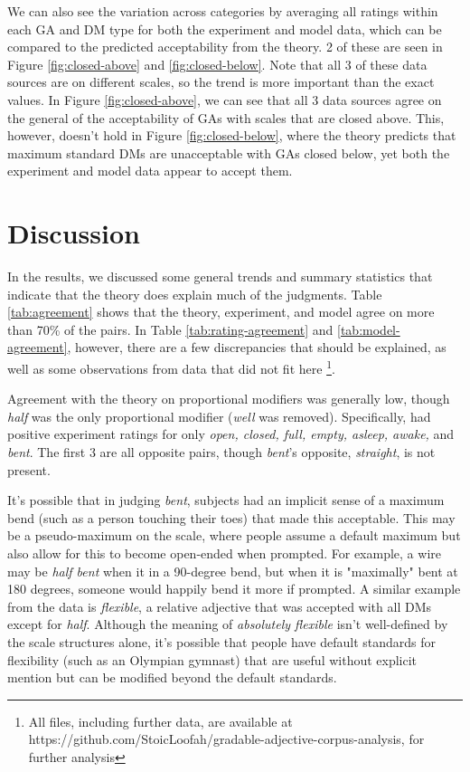 \documentclass[11pt]{article}
\begin{document}
We can also see the variation across categories by averaging all ratings within each GA and DM type for both the experiment and model data, which can be compared to the predicted acceptability from the theory. 2 of these are seen in Figure \ref{fig:closed-above} and \ref{fig:closed-below}. Note that all 3 of these data sources are on different scales, so the trend is more important than the exact values. In Figure \ref{fig:closed-above}, we can see that all 3 data sources agree on the general of the acceptability of GAs with scales that are closed above. This, however, doesn't hold in Figure \ref{fig:closed-below}, where the theory predicts that maximum standard DMs are unacceptable with GAs closed below, yet both the experiment and model data appear to accept them.

\section{Discussion}

In the results, we discussed some general trends and summary statistics that indicate that the theory does explain much of the judgments. Table \ref{tab:agreement} shows that the theory, experiment, and model agree on more than 70\% of the pairs. In Table \ref{tab:rating-agreement} and \ref{tab:model-agreement}, however, there are a few discrepancies that should be explained, as well as some observations from data that did not fit here \footnote{All files, including further data, are available at https://github.com/StoicLoofah/gradable-adjective-corpus-analysis, for further analysis}.

Agreement with the theory on proportional modifiers was generally low, though \textit{half} was the only proportional modifier (\textit{well} was removed). Specifically,  had positive experiment ratings for only \textit{open, closed, full, empty, asleep, awake,} and \textit{bent}. The first 3 are all opposite pairs, though \textit{bent}'s opposite, \textit{straight}, is not present. 

It's possible that in judging \textit{bent}, subjects had an implicit sense of a maximum bend (such as a person touching their toes) that made this acceptable. This may be a pseudo-maximum on the scale, where people assume a default maximum but also allow for this to become open-ended when prompted. For example, a wire may be \textit{half bent} when it in a 90-degree bend, but when it is "maximally" bent at 180 degrees, someone would happily bend it more if prompted. A similar example from the data is \textit{flexible}, a relative adjective that was accepted with all DMs except for \textit{half}. Although the meaning of \textit{absolutely flexible} isn't well-defined by the scale structures alone, it's possible that people have default standards for flexibility (such as an Olympian gymnast) that are useful without explicit mention but can be modified beyond the default standards.
\end{document}
